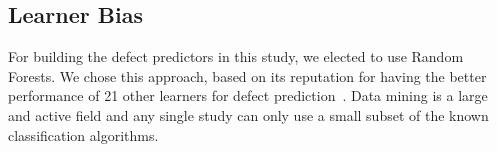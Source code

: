 \documentclass{sig-alternate}
\newcommand{\bi}{\begin{itemize}}
\newcommand{\ei}{\end{itemize}}
\newcommand{\tion}[1]{\textsection\ref{sect:#1}}
\newcommand{\fig}[1]{Figure~\ref{fig:#1}}
\begin{document}





\subsection{ Learner Bias}
For building the defect predictors in this study, we elected
to use  Random Forests. We chose this approach,  based on its reputation for having the better  performance of 21 other learners for defect prediction~\cite{lessmann}. Data mining is a large and active field and any single study can only use a small subset of the known classification algorithms.  
\end{document}
